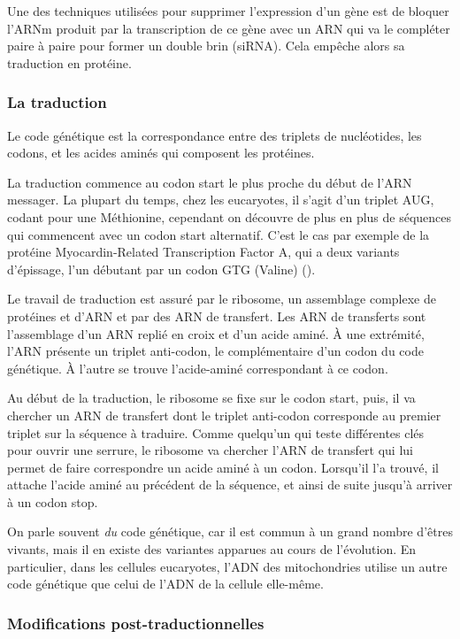 Une des techniques utilisées pour supprimer l'expression d'un gène est de bloquer l'ARNm produit par la transcription de ce gène avec un ARN qui va le compléter paire à paire pour former un double brin (siRNA). Cela empêche alors sa traduction en protéine. 

\subsubsection{La traduction}

Le code génétique est la correspondance entre des triplets de nucléotides, les codons, et les acides aminés qui composent les protéines. 

La traduction commence au codon start le plus proche du début de l'ARN messager. La plupart du temps, chez les eucaryotes, il s'agit d'un triplet AUG, codant pour une Méthionine, cependant on découvre de plus en plus de séquences qui commencent avec un codon start alternatif. C'est le cas par exemple de la protéine Myocardin-Related Transcription Factor A, qui a deux variants d'épissage, l'un débutant par un codon GTG (Valine) (\cite{scharenberg_tgf-_2014}).

Le travail de traduction est assuré par le ribosome, un assemblage complexe de protéines et d'ARN et par des ARN de transfert. Les ARN de transferts sont l'assemblage d'un ARN replié en croix et d'un acide aminé. À une extrémité, l'ARN présente un triplet anti-codon, le complémentaire d'un codon du code génétique. À l'autre se trouve l'acide-aminé correspondant à ce codon. 

Au début de la traduction, le ribosome se fixe sur le codon start, puis, il va chercher un ARN de transfert dont le triplet anti-codon corresponde au premier triplet sur la séquence à traduire. Comme quelqu'un qui teste différentes clés pour ouvrir une serrure, le ribosome va chercher l'ARN de transfert qui lui permet de faire correspondre un acide aminé à un codon. Lorsqu'il l'a trouvé, il attache l'acide aminé au précédent de la séquence, et ainsi de suite jusqu'à arriver à un codon stop. 

On parle souvent \emph{du} code génétique, car il est commun à un grand nombre d'êtres vivants, mais il en existe des variantes apparues au cours de l'évolution. En particulier, dans les cellules eucaryotes, l'ADN des mitochondries utilise un autre code génétique que celui de l'ADN de la cellule elle-même. 

\subsubsection{Modifications post-traductionnelles}

